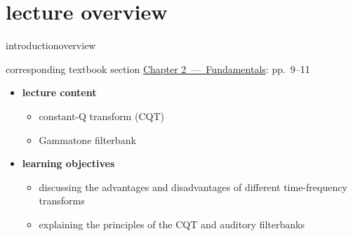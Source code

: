 




\subtitle{Module 2.6: Fundamentals~---~Non-Fourier Time-Frequency Transforms}


	

    \section[overview]{lecture overview}
        \begin{frame}{introduction}{overview}
            \begin{block}{corresponding textbook section}
                    \href{http://ieeexplore.ieee.org/xpl/articleDetails.jsp?tp=&arnumber=6331119&}{Chapter 2~---~Fundamentals}: pp.~9--11
            \end{block}

            \begin{itemize}
                \item   \textbf{lecture content}
                    \begin{itemize}
                        \item   constant-Q transform (CQT)
                        \item   Gammatone filterbank
                    \end{itemize}
                \bigskip
                \item<2->   \textbf{learning objectives}
                    \begin{itemize}
                        \item   discussing the advantages and disadvantages of different time-frequency transforms
                        \item   explaining the principles of the CQT and auditory filterbanks
                    \end{itemize}
            \end{itemize}
        \end{frame}
        

